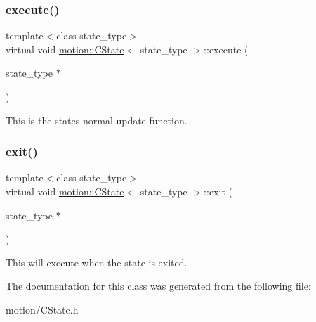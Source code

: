 \subsubsection{\texorpdfstring{execute()}{execute()}}
{\footnotesize\ttfamily template$<$class state\+\_\+type$>$ \\
virtual void \mbox{\hyperlink{classmotion_1_1CState}{motion\+::\+C\+State}}$<$ state\+\_\+type $>$\+::execute (\begin{DoxyParamCaption}\item[{state\+\_\+type $\ast$}]{ }\end{DoxyParamCaption})\hspace{0.3cm}{\ttfamily [pure virtual]}}

This is the states normal update function. \mbox{\label{classmotion_1_1CState_a353db064c159d66b82bf257b35e7c016}} 
\subsubsection{\texorpdfstring{exit()}{exit()}}
{\footnotesize\ttfamily template$<$class state\+\_\+type$>$ \\
virtual void \mbox{\hyperlink{classmotion_1_1CState}{motion\+::\+C\+State}}$<$ state\+\_\+type $>$\+::exit (\begin{DoxyParamCaption}\item[{state\+\_\+type $\ast$}]{ }\end{DoxyParamCaption})\hspace{0.3cm}{\ttfamily [pure virtual]}}

This will execute when the state is exited. 

The documentation for this class was generated from the following file\+:\begin{DoxyCompactItemize}
\item 
motion/C\+State.\+h\end{DoxyCompactItemize}
